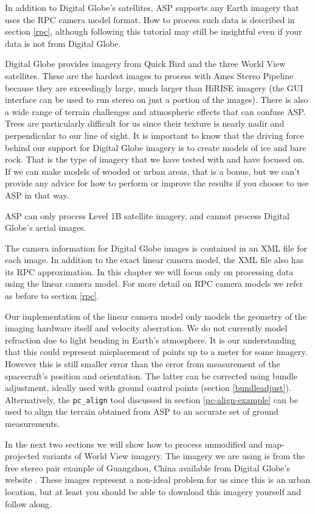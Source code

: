 In addition to Digital Globe's satellites, ASP supports any Earth imagery
that uses the RPC camera model format. How to process such data is
described in section \ref{rpc}, although following this tutorial may
still be insightful even if your data is not from Digital Globe.

Digital Globe provides imagery from Quick Bird and the three World
View satellites. These are the hardest images to process with Ames
Stereo Pipeline because they are exceedingly large, much larger than
HiRISE imagery (the GUI interface can be used to run stereo on just a
portion of the images). There is also a wide range of terrain challenges and
atmospheric effects that can confuse ASP. Trees are particularly
difficult for us since their texture is nearly nadir and perpendicular
to our line of sight. It is important to know that the driving force
behind our support for Digital Globe imagery is to create models of
ice and bare rock. That is the type of imagery that we have tested
with and have focused on. If we can make models of wooded or urban
areas, that is a bonus, but we can't provide any advice for how to
perform or improve the results if you choose to use ASP in that way.

ASP can only process Level 1B satellite imagery, and cannot process
Digital Globe's aerial images.

The camera information for Digital Globe images is contained in an XML
file for each image. In addition to the exact linear camera model, the
XML file also has its RPC approximation. In this chapter we will focus
only on processing data using the linear camera model.  For more detail
on RPC camera models we refer as before to section \ref{rpc}.

Our implementation of the linear camera model only models the geometry
of the imaging hardware itself and velocity aberration. We do not
currently model refraction due to light bending in Earth's
atmosphere. It is our understanding that this could represent
misplacement of points up to a meter for some imagery. However this is
still smaller error than the error from measurement of the spacecraft's
position and orientation. The latter can be corrected using bundle
adjustment, ideally used with ground control points (section
\ref{bundleadjust}). Alternatively, the \texttt{pc\_align} tool
discussed in section \ref{pc-align-example} can be used to align the
terrain obtained from ASP to an accurate set of ground
measurements.

In the next two sections we will show how to process unmodified and
map-projected variants of World View imagery. The imagery we are using is
from the free stereo pair example of Guangzhou, China available from
Digital Globe's website \cite{digital-globe:samples}. These images
represent a non-ideal problem for us since this is an urban location,
but at least you should be able to download this imagery yourself and
follow along.

